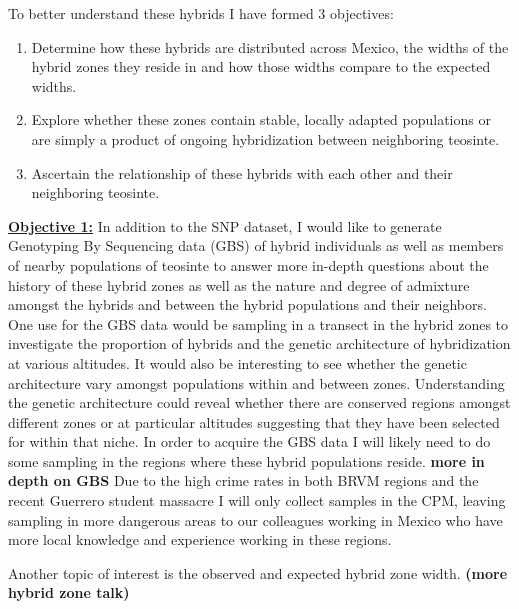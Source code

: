 \documentclass[12pt]{amsart}
\begin{document}
To better understand these hybrids I have formed 3 objectives: 
\begin{enumerate} 
	\item Determine how these hybrids are distributed across Mexico, the widths of the hybrid zones they reside in and how those widths compare to the expected widths.
	\item Explore whether these zones contain stable, locally adapted populations or are simply a product of ongoing hybridization between neighboring teosinte.
	\item Ascertain the relationship of these hybrids with each other and their neighboring teosinte.
\end{enumerate} 

\hfill\break \textbf{\underline{Objective 1:} } 
In addition to the SNP dataset, I would like to generate Genotyping By Sequencing data (GBS) of hybrid individuals as well as members of nearby populations of teosinte to answer more in-depth questions about the history of these hybrid zones as well as the nature and degree of admixture amongst the hybrids and between the hybrid populations and their neighbors.  
One use for the GBS data would be sampling in a transect in the hybrid zones to investigate the proportion of hybrids and the genetic architecture of hybridization  at various altitudes.  
It would also be interesting to see whether the genetic architecture vary amongst populations within and between zones.
Understanding the genetic architecture could reveal whether there are conserved regions amongst different zones or at particular altitudes suggesting that they have been selected for within that niche.
In order to acquire the GBS data I will likely  need to do some sampling in the regions where these hybrid populations reside.  
\textbf{more in depth on GBS}
Due to the high crime rates in both BRVM regions and the recent Guerrero student massacre I will only collect samples in the CPM, leaving sampling in more dangerous areas to our colleagues working in Mexico who have more local knowledge and experience working in these regions.

Another topic of interest is the observed and expected hybrid zone width. \textbf{(more hybrid zone talk)}
\end{document}

